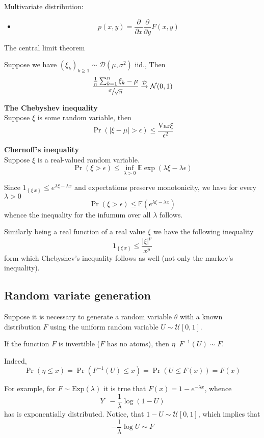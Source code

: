 \documentclass[a4paper]{article}
\newcommand{\obj}[1]{{\left\{ #1 \right \}}}
\newcommand{\clo}[1]{{\left [ #1 \right ]}}
\newcommand{\brac}[1]{{\left ( #1 \right )}}
\newcommand{\abs}[1]{{\left | #1 \right |}}
\newcommand{\Ex}{\mathbb{E}}
\newcommand{\Var}{\text{Var}}
\newcommand{\defn}{\mathop{\overset{\Delta}{=}}\nolimits}
\begin{document}
Multivariate distribution:
\begin{itemize}
	\item \[p(x,y) = \frac{\partial}{\partial x}\frac{\partial}{\partial y} F(x,y)\]
\end{itemize}

The central limit theorem

Suppose we have $\brac{\xi_k}_{k\geq1}\sim \mathcal{D}(\mu, \sigma^2)$ iid., Then
\[\frac{\frac{1}{n}\sum_{k=1}^n \xi_k - \mu}{\sfrac{\sigma}{\sqrt{n}}} \overset{\mathcal{D}}{\to} \mathcal{N}(0,1)\]

\noindent\textbf{The Chebyshev inequality}\hfill\\
Suppose $\xi$ is some random variable, then 
\[\Pr\brac{\abs{\xi-\mu}> \epsilon}\leq \frac{\Var{\xi}}{\epsilon^2}\] 

\noindent\textbf{Chernoff's inequality}\hfill\\
Suppose $\xi$ is a real-valued random variable.
\[\Pr\brac{\xi>\epsilon}\leq \inf_{\lambda>0} \Ex\exp\brac{\lambda\xi - \lambda\epsilon}\]

Since $1_\obj{\xi\>x}\leq e^{\lambda \xi - \lambda x}$ and expectations preserve monotonicity, we have for every $\lambda>0$
\[\Pr\brac{\xi>\epsilon}\leq \Ex\brac{e^{\lambda \xi - \lambda x}}\]
whence the inequality for the infumum over all $\lambda$ follows.

Similarly being a real function of a real value $\xi$ we have the following inequality
\[1_\obj{\xi\>x}\leq \frac{\abs{\xi}^p}{x^p}\]
form which Chebyshev's inequality follows as well (not only the markov's inequality).

\subsection{Random variate generation} %
\label{sub:random_variate_generation}

Suppose it is necessary to generate a random variable $\theta$ with a known distribution $F$ using the uniform random variable $U\sim\mathcal{U}\clo{0,1}$.

If the function $F$ is invertible ($F$ has no atoms), then $\eta \defn F^{-1}(U)\sim F$.

Indeed, \[\Pr\brac{\eta\leq x} = \Pr\brac{F^{-1}(U)\leq x} = \Pr\brac{U\leq F(x)} = F(x)\]

For example, for $F\sim \text{Exp}(\lambda)$ it is true that $F(x)= 1-e^{-\lambda x}$, whence \[Y \defn -\frac{1}{\lambda}\log{(1-U)}\] has is exponentially distributed. Notice, that $1-U\sim\mathcal{U}\clo{0,1}$, which implies that \[-\frac{1}{\lambda}\log U \sim F\]
\end{document}
